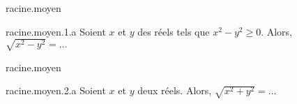 
\begin{qcm}{racine.moyen}
    \begin{question}{racine.moyen.1.a}
      Soient \(x\) et \(y\) des réels tels que \(x^2-y^2\geq 0\). Alors, \(\sqrt{x^2-y^2}=\ldots\)
         \vspace{-1.5ex}
         \begin{multicols}{2}
         \begin{reponses}
            \lastchoices
         \end{reponses}
         \end{multicols}
    \end{question}
\end{qcm}


\begin{qcm}{racine.moyen}
    \begin{question}{racine.moyen.2.a}
     Soient \(x\) et \(y\) deux réels. Alors, \(\sqrt{x^2+y^2}=\ldots\)
         \vspace{-1.5ex}
         \begin{multicols}{2}
         \begin{reponses}
            \lastchoices
         \end{reponses}
         \end{multicols}
    \end{question}
\end{qcm}
